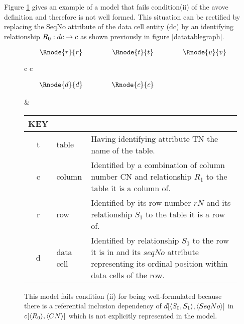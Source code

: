 \documentclass[10pt,a4paper]{article}
\begin{document}
Figure \ref{rawdatatablegraph} gives an example of a model that fails condition(ii) of the avove definition and
therefore is not well formed. This situation can be rectified by replacing the SeqNo attribute of 
the data cell entity (dc) by an identifying relationship $R_0:dc \rightarrow c$ as shown previously in figure \ref{datatablegraph}.

\begin{figure} [H]
\begin{center}
\begin{tabular}{c c}
$
\begin{array}{cp{0.75cm}cp{0.75cm}c}
   \Rnode{r}{r}     & & \Rnode{t}{t} & & \Rnode{v}{v} \\[1.2cm]     
	 \Rnode{d}{d}   & & \Rnode{c}{c} & &               
\end{array}
$
\idcomp
{} 
\idcomp
{} 
\idcomp
{}
\idcomp
{}
\idcomp
{}
\idcomp
{}
\idcomp

& \footnotesize
\begin{tabular}{c p{1.5cm} p{4cm}}
KEY && \\
\hline
t & table & Having identifying attribute TN the name of the table. \\
c & column & Identified by a combination of column number CN and relationship $R_1$ to the table it is a column of.\\
r & row & Identified by its row number $rN$ and its relationship $S_1$ to the table it is a row of.\\
d & data cell & Identified by relationship $S_0$ to the row it is in and its $seqNo$ attribute
representing its ordinal position within data cells of the row. \\
\end{tabular} 
\end{tabular}
\end{center}
\caption{This model fails condition (ii) for being well-formulated
because there is a referential inclusion dependency of $d[ \langle S_0,S_1\rangle,\langle SeqNo\rangle]$
in $c[\langle R_0\rangle,\langle CN\rangle]$ which is not explicitly represented in the model.}
\label{rawdatatablegraph}
\end{figure}
\end{document}
